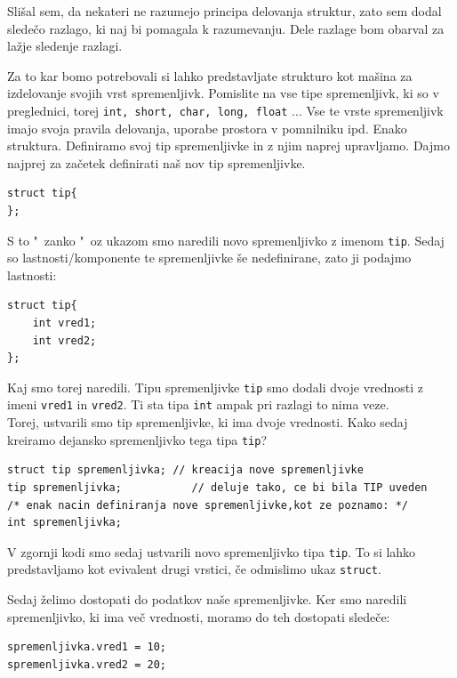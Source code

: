 \documentclass[a4paper, 12pt]{article}
\begin{document}
Slišal sem, da nekateri ne razumejo principa delovanja struktur, zato sem dodal sledečo razlago, ki naj bi pomagala k razumevanju. Dele razlage bom obarval za lažje sledenje razlagi.\

Za to kar bomo potrebovali si lahko predstavljate strukturo kot mašina za izdelovanje svojih vrst spremenljivk. Pomislite na vse tipe spremenljivk, ki so v preglednici, torej \lstinline|int, short, char, long, float| ... Vse te vrste spremenljivk imajo svoja pravila delovanja, uporabe prostora v pomnilniku ipd. Enako struktura. Definiramo svoj tip spremenljivke in z njim naprej upravljamo. Dajmo najprej za začetek definirati naš nov tip spremenljivke.

\begin{lstlisting}
struct tip{
};
\end{lstlisting}

S to "\ zanko "\ oz ukazom smo naredili novo spremenljivko z imenom \lstinline|tip|. Sedaj so lastnosti/komponente te spremenljivke še nedefinirane, zato ji podajmo lastnosti:

\begin{lstlisting}
struct tip{
	int vred1;
	int vred2;
};
\end{lstlisting}

Kaj smo torej naredili. Tipu spremenljivke \lstinline|tip| smo dodali dvoje vrednosti z imeni \lstinline|vred1| in \lstinline|vred2|. Ti sta tipa \lstinline|int| ampak pri razlagi to nima veze.\\
Torej, ustvarili smo tip spremenljivke, ki ima dvoje vrednosti. Kako sedaj kreiramo dejansko spremenljivko tega tipa \lstinline|tip|?

\begin{lstlisting}
struct tip spremenljivka; // kreacija nove spremenljivke
tip spremenljivka;			 // deluje tako, ce bi bila TIP uveden
/* enak nacin definiranja nove spremenljivke,kot ze poznamo: */
int spremenljivka;
\end{lstlisting}

V zgornji kodi smo sedaj ustvarili novo spremenljivko tipa \lstinline|tip|. To si lahko predstavljamo kot evivalent drugi vrstici, če odmislimo ukaz \lstinline|struct|. 

Sedaj želimo dostopati do podatkov naše spremenljivke. Ker smo naredili spremenljivko, ki ima več vrednosti, moramo do teh dostopati sledeče:

\begin{lstlisting}
spremenljivka.vred1 = 10;
spremenljivka.vred2 = 20;
\end{lstlisting}
\end{document}
